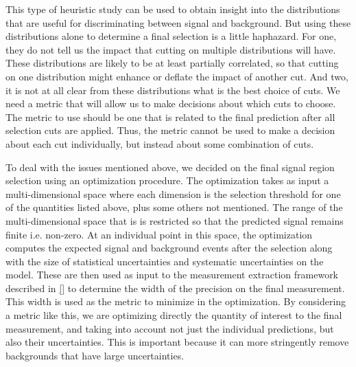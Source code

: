 This type of heuristic study  can be used to obtain insight into
the distributions that are useful for discriminating 
between signal and background.  But using these distributions
alone to determine a final selection is a little haphazard.
For one, they do not tell us the impact that cutting on multiple
distributions will have.  These distributions are likely to be 
at least partially correlated, so that cutting on one distribution might
enhance or deflate the impact of another cut. 
And two, it is not at all clear from these distributions
what is the best choice of cuts. We need a metric that will
allow us to make decisions about which cuts to choose.
The metric to use should be one that is 
related to the final prediction after all selection cuts are applied.
Thus, the metric cannot be used to make a decision about each 
cut individually, but instead about some combination of cuts.

To deal with the issues mentioned above, we 
decided on the final signal region selection using an optimization
procedure. The optimization takes as input a multi-dimensional 
space where each dimension is the selection threshold
for one of the quantities listed above, plus some others not mentioned.
The range of the multi-dimensional space that is 
is restricted so that the 
predicted signal remains finite i.e. non-zero.
At an individual point in this space, the optimization computes
the expected signal and background events after the selection
along with the size of statistical uncertainties
and systematic uncertainties on the model. 
These are then used as input to the measurement extraction framework
described in \sec\ref{} to determine the width of the precision
on the final measurement. 
This width is used as the metric to minimize in the optimization.
By considering a metric like this, we are optimizing directly
the quantity of interest to the final measurement, and taking
into account not just the individual predictions, but also their
uncertainties. This is important because it can more stringently
remove backgrounds that have large uncertainties.

